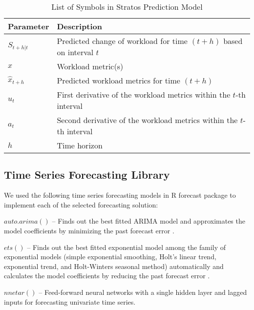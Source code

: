 \begin{table}[]
\centering
\caption{List of Symbols in Stratos Prediction Model}
\begin{tabular}{|l|l|}
\hline
Parameter       & Description                                                                     \\ \hline
$S_{t+h|t}$     & Predicted change of workload for time $(t+h)$ based on interval $t$ \\
$x$             & Workload metric(s)                                                                \\ \hline
$\hat{x}_{t+h}$ & Predicted workload metrics for time $(t+h)$                                       \\ \hline
$u_{t}$         & First derivative of the workload metrics within the $t$-th interval           \\ \hline
$a_{t}$         & Second derivative of the workload metrics within the $t$-th interval          \\ \hline
$h$             & Time horizon \\ \hline
\end{tabular}
\end{table}

\subsection{Time Series Forecasting Library}

We used the following time series forecasting models in R forecast package \cite{forecastPackage} to implement each of the selected forecasting solution:

\noindent
$auto.arima()$ -- Finds out the best fitted ARIMA model and approximates the model coefficients by minimizing the past forecast error \cite{Forecasting_OTexts}.

\noindent
$ets()$ -- Finds out the best fitted exponential model among the family of exponential models (simple exponential smoothing, Holt's linear trend, exponential trend, and Holt-Winters seasonal method) automatically and calculates the model coefficients by reducing the past forecast error \cite{Forecasting_OTexts}.

\noindent
$nnetar()$ -- Feed-forward neural networks with a single hidden layer and lagged inputs for forecasting univariate time series.